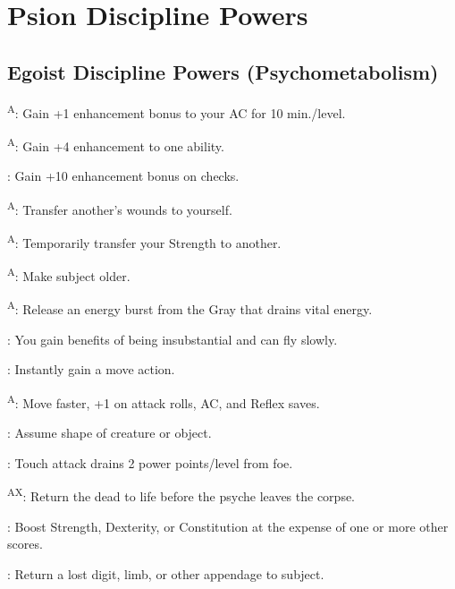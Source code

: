 \section{Psion Discipline Powers}



\subsection{Egoist Discipline Powers {\normalsize(Psychometabolism)}}
\begin{enumerate*}
\item {}\textsuperscript{A}: Gain +1 enhancement bonus to your AC for 10 min./level.
\item {}\textsuperscript{A}: Gain +4 enhancement to one ability.

: Gain +10 enhancement bonus on  checks.

\textsuperscript{A}: Transfer another's wounds to yourself.

\textsuperscript{A}: Temporarily transfer your Strength to another. %

\item {}\textsuperscript{A}: Make subject older. %

\textsuperscript{A}: Release an energy burst from the Gray that drains vital energy. %

: You gain benefits of being insubstantial and can fly slowly.

: Instantly gain a move action.

\item {}\textsuperscript{A}: Move faster, +1 on attack rolls, AC, and Reflex saves. %

: Assume shape of creature or object.

: Touch attack drains 2 power points/level from foe.

\item {}\textsuperscript{AX}: Return the dead to life before the psyche leaves the corpse.

: Boost Strength, Dexterity, or Constitution at the expense of one or more other scores.

: Return a lost digit, limb, or other appendage to subject.


\end{enumerate*}
